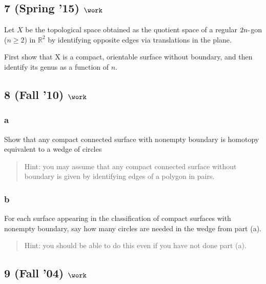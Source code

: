 \hypertarget{spring-15-work-4}{%
\subsection{\texorpdfstring{7 (Spring '15)
\(\work\)}{7 (Spring '15) \textbackslash work}}\label{spring-15-work-4}}

Let \(X\) be the topological space obtained as the quotient space of a
regular \(2n{\hbox{-}}\)gon (\(n \geq 2\)) in \({\mathbb{R}}^2\) by
identifying opposite edges via translations in the plane.

First show that X is a compact, orientable surface without boundary, and
then identify its genus as a function of \(n\).

\hypertarget{fall-10-work-2}{%
\subsection{\texorpdfstring{8 (Fall '10)
\(\work\)}{8 (Fall '10) \textbackslash work}}\label{fall-10-work-2}}

\hypertarget{a-3}{%
\subsubsection{a}\label{a-3}}

Show that any compact connected surface with nonempty boundary is
homotopy equivalent to a wedge of circles

\begin{quote}
Hint: you may assume that any compact connected surface without boundary
is given by identifying edges of a polygon in pairs.
\end{quote}

\hypertarget{b-3}{%
\subsubsection{b}\label{b-3}}

For each surface appearing in the classification of compact surfaces
with nonempty boundary, say how many circles are needed in the wedge
from part (a).

\begin{quote}
Hint: you should be able to do this even if you have not done part (a).
\end{quote}

\hypertarget{fall-04-work-4}{%
\subsection{\texorpdfstring{9 (Fall '04)
\(\work\)}{9 (Fall '04) \textbackslash work}}\label{fall-04-work-4}}

